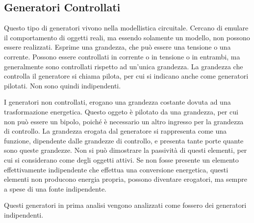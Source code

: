\documentclass{article}
\numberwithin{equation}{subsection}
\begin{document}
\subsection{Generatori Controllati}

Questo tipo di generatori vivono nella modellistica circuitale. Cercano di emulare il comportamento di oggetti reali, ma essendo solamente un modello, non possono essere 
realizzati. 
Esprime una grandezza, che può essere una tensione o una corrente. Possono essere controllati in corrente o in tensione o in entrambi, ma generalmente sono controllati rispetto 
ad un'unica grandezza. La grandezza che controlla il generatore si chiama pilota, per cui si indicano anche come generatori pilotati. Non sono quindi indipendenti. 

I generatori non controllati, erogano una grandezza costante dovuta ad una trasformazione energetica. Questo oggeto è pilotato da una grandezza, per cui non può essere 
un bipolo, poiché è necessario un altro ingresso per la grandezza di controllo. La grandezza erogata dal generatore si rappresenta come una funzione, dipendente dalle 
grandezze di controllo, e presenta tante porte quante sono queste grandezze. Non si può dimostrare la passività di questi elementi, per cui si considerano come degli oggetti 
attivi. 
Se non fosse presente un elemento effettivamente indipendente che effettua una conversione energetica, questi elementi non producono energia propria, possono diventare 
erogatori, ma sempre a spese di una fonte indipendente. 


Questi generatori in prima analisi vengono analizzati come fossero dei generatori indipendenti. 
\end{document}
